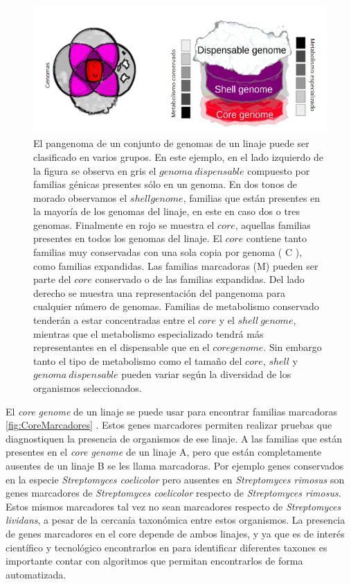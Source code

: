 \documentclass[12pt,twoside]{reedthesis}
\begin{document}
  \begin{figure}[h!tbp]
  \centering
  \includegraphics[angle = 0,scale = .75]{chapter1/Metabolismo-Pangenoma.png}
  \caption[El metabolismo en el Pangenoma]{\footnotesize{El pangenoma de un conjunto de genomas de un linaje puede ser clasificado en varios grupos. En este ejemplo, en el lado izquierdo de la figura se observa en gris el $genoma~dispensable$ compuesto por familias génicas presentes sólo en un genoma. En dos tonos de morado observamos el $shell genome$, familias que están presentes en la mayoría de los genomas del linaje, en este en caso dos o tres genomas. Finalmente en rojo se muestra el $core$, aquellas familias presentes en todos los genomas del linaje. El $core$ contiene tanto familias muy conservadas con una sola copia por genoma ( C ), como familias expandidas. Las familias marcadoras (M) pueden ser parte del $core$ conservado o de las familias expandidas. Del lado derecho se muestra una representación del pangenoma para cualquier número de genomas. Familias de metabolismo conservado tenderán a estar concentradas entre el $core$ y el $shell~genome$, mientras que el metabolismo especializado tendrá más representantes en el dispensable que en el $core genome$. Sin embargo tanto el tipo de metabolismo como el tamaño del $core$, $shell$ y $genoma~dispensable$ pueden variar según la diversidad de los organismos seleccionados. }}
  \label{fig:MetabolismoPangenoma}
  \end{figure}
  
  El \emph{core genome} de un linaje se puede usar para encontrar familias
  marcadoras \autoref{fig:CoreMarcadores} . Estos genes marcadores
  permiten realizar pruebas que diagnostiquen la presencia de organismos
  de ese linaje. A las familias que están presentes en el \emph{core
  genome} de un linaje A, pero que están completamente ausentes de un
  linaje B se les llama marcadoras. Por ejemplo genes conservados en la
  especie \emph{Streptomyces coelicolor} pero ausentes en
  \emph{Streptomyces rimosus} son genes marcadores de \emph{Streptomyces
  coelicolor} respecto de \emph{Streptomyces rimosus}. Estos mismos
  marcadores tal vez no sean marcadores respecto de \emph{Streptomyces
  lividans}, a pesar de la cercanía taxonómica entre estos organismos. La
  presencia de genes marcadores en el core depende de ambos linajes, y ya
  que es de interés científico y tecnológico encontrarlos en para
  identificar diferentes taxones es importante contar con algoritmos que
  permitan encontrarlos de forma automatizada.
  
\end{document}
